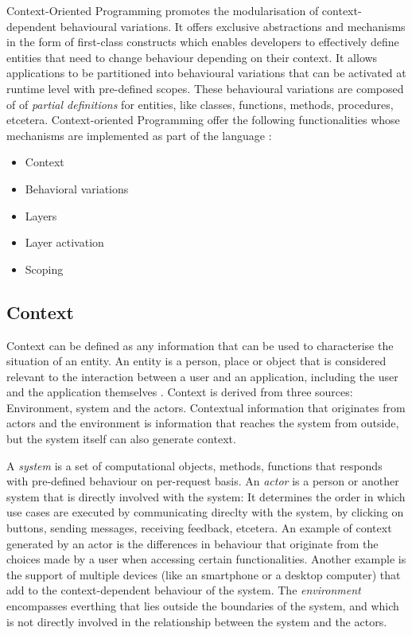 \documentclass{acm_proc_article-sp}
\begin{document}
Context-Oriented Programming promotes the modularisation of context-dependent behavioural variations. It offers exclusive abstractions and mechanisms in the form of first-class constructs which enables developers to effectively define entities that need to change behaviour depending on their context. It allows applications to be partitioned into behavioural variations that can be activated at runtime level with pre-defined scopes. These behavioural variations are composed of of \textit{partial definitions} for entities, like classes, functions, methods, procedures, etcetera. Context-oriented Programming offer the following functionalities whose mechanisms are implemented as part of the language \cite{Costanza:2008:CPC:1529966.1529970}:

\begin{itemize}
\item {Context}
\item Behavioral variations
\item Layers
\item Layer activation
\item Scoping
\end{itemize}

\subsection{Context}
Context can be defined as any information that can be used to characterise the situation of an entity. An entity is a person, place or object that is considered relevant to the interaction between a user and an application, including the user and the application themselves \cite{Abowd:1999:TBU:647985.743843}. Context is derived from three sources: Environment, system and the actors. Contextual information that originates from actors and the environment is information that reaches the system from outside, but the system itself can also generate context. 

A \textit{system} is a set of computational objects, methods, functions that responds with pre-defined behaviour on per-request basis. An \textit{actor} is a person or another system that is directly involved with the system: It determines the order in which use cases are executed by communicating direclty with the system, by clicking on buttons, sending messages, receiving feedback, etcetera. An example of context generated by an actor is the differences in behaviour that originate from the choices made by a user when accessing certain functionalities. Another example is the support of multiple devices (like an smartphone or a desktop computer) that add to the context-dependent behaviour of the system. The \textit{environment} encompasses everthing that lies outside the boundaries of the system, and which is not directly involved in the relationship between the system and the actors.
\end{document}

